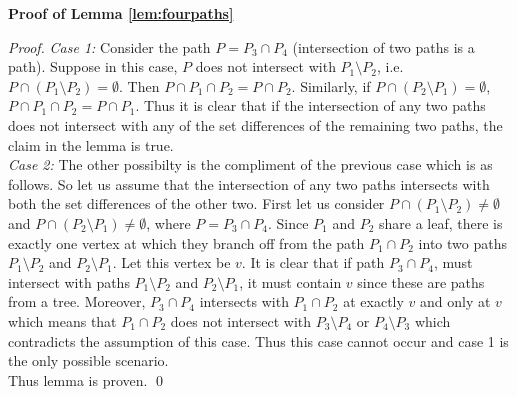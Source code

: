 \documentclass[a4paper,UKenglish,numberwithinsect]{lipics}
\begin{document}
\noindent
{\bf Proof of Lemma \ref{lem:fourpaths}}\\
\begin{proof}
  {\em Case 1:} Consider the path $P = P_3 \cap P_4$ (intersection of
  two paths is a path).
  Suppose in this case, $P$ does not intersect with $P_1 \setminus
  P_2$, i.e. $P \cap (P_1 \setminus P_2) = \emptyset$. Then $P \cap P_1 \cap
  P_2 = P \cap P_2$. Similarly, if $P \cap (P_2 \setminus P_1) = \emptyset$,
  $P \cap P_1 \cap P_2 = P \cap P_1$. Thus it is clear that if the
  intersection of any two paths does not intersect with any of the set
  differences of
  the remaining two paths, the claim in the lemma is true.\\
  {\em Case 2:} The other possibilty is the compliment of the previous
  case which is as follows. So let us assume that the intersection of
  any two paths intersects with both the set differences of the other
  two. First let us consider $P \cap (P_1 \setminus P_2) \ne \emptyset$ and
  $P \cap (P_2 \setminus P_1) \ne \emptyset$, where $P = P_3 \cap P_4$. Since
  $P_1$ and $P_2$ share a leaf, there is exactly one vertex at which
  they branch off from the path $P_1 \cap P_2$ into two paths $P_1
  \setminus P_2$ and $P_2 \setminus P_1$. Let this vertex be $v$. It
  is clear that if path $P_3 \cap P_4$, must intersect with paths $P_1
  \setminus P_2$ and $P_2 \setminus P_1$, it must contain $v$ since
  these are paths from a tree. Moreover, $P_3 \cap P_4$ intersects
  with $P_1 \cap P_2$ at exactly $v$ and only at $v$ which means that
  $P_1 \cap P_2$ does not intersect with $P_3 \setminus P_4$ or $P_4
  \setminus P_3$ which contradicts the assumption of this case. Thus
  this  case cannot occur and case 1 is the only possible scenario. \\
  Thus lemma is proven. \qed
\end{proof}
\end{document}

